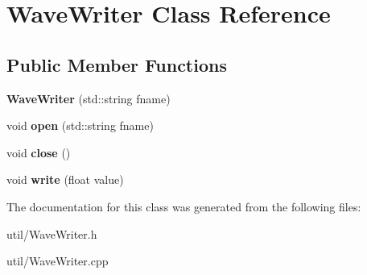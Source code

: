 \hypertarget{classWaveWriter}{}\section{Wave\+Writer Class Reference}
\label{classWaveWriter}
\subsection*{Public Member Functions}
\begin{DoxyCompactItemize}
\item 
{\bfseries Wave\+Writer} (std\+::string fname)\hypertarget{classWaveWriter_ab56ef6702c7c651004329fe76893b2f7}{}\label{classWaveWriter_ab56ef6702c7c651004329fe76893b2f7}

\item 
void {\bfseries open} (std\+::string fname)\hypertarget{classWaveWriter_a369569d5d2068f497731936073ad4ad1}{}\label{classWaveWriter_a369569d5d2068f497731936073ad4ad1}

\item 
void {\bfseries close} ()\hypertarget{classWaveWriter_ae50259472af637a4083399953440ee0e}{}\label{classWaveWriter_ae50259472af637a4083399953440ee0e}

\item 
void {\bfseries write} (float value)\hypertarget{classWaveWriter_a267d0704f57004f0adf079096d3dc460}{}\label{classWaveWriter_a267d0704f57004f0adf079096d3dc460}

\end{DoxyCompactItemize}


The documentation for this class was generated from the following files\+:\begin{DoxyCompactItemize}
\item 
util/Wave\+Writer.\+h\item 
util/Wave\+Writer.\+cpp\end{DoxyCompactItemize}
